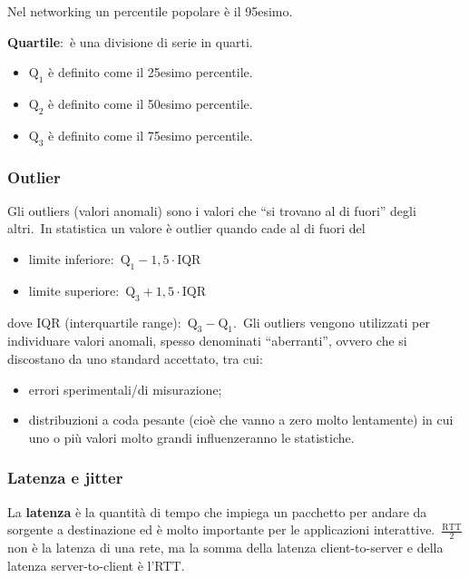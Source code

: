 \vspace{12pt}
\noindent Nel networking un percentile popolare è il 95esimo.\

\vspace{12pt}
\noindent\textbf{Quartile}:\ è una divisione di serie in quarti.

\begin{itemize}
    \item $\mathrm{Q_1}$ è definito come il 25esimo percentile.
    \item $\mathrm{Q_2}$ è definito come il 50esimo percentile.
    \item $\mathrm{Q_3}$ è definito come il 75esimo percentile.
\end{itemize}

\subsubsection{Outlier}

Gli outliers (valori anomali) sono i valori che ``si trovano al di fuori'' degli altri.\
In statistica un valore è outlier quando cade al di fuori del

\begin{itemize}
    \item limite inferiore:\ $\mathrm{Q_1} - 1,5 \cdot \mathrm{IQR}$
    \item limite superiore:\ $\mathrm{Q_3} + 1,5 \cdot \mathrm{IQR}$
\end{itemize}
dove IQR (interquartile range):\ $\mathrm{Q_3 - Q_1}$.\
Gli outliers vengono utilizzati per individuare valori anomali, spesso denominati ``aberranti'', ovvero che si discostano da uno standard accettato, tra cui:
\begin{itemize}
    \item errori sperimentali/di misurazione;
    \item distribuzioni a coda pesante (cioè che vanno a zero molto lentamente) in cui uno o più valori molto grandi influenzeranno le statistiche.
\end{itemize}

\subsubsection{Latenza e jitter}

La \textbf{latenza} è la quantità di tempo che impiega un pacchetto per andare da sorgente a destinazione ed è molto importante per le applicazioni interattive.\
$\frac{\mathrm{RTT}}{2}$ non è la latenza di una rete, ma la somma della latenza client-to-server e della latenza server-to-client è l'RTT.\

